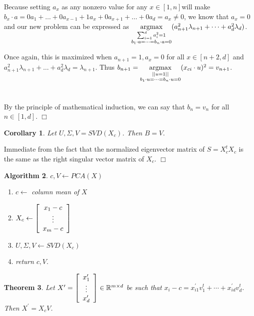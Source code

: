 \documentclass{article}%
\newtheorem{theorem}{Theorem}
\newtheorem{algorithm}[theorem]{Algorithm}
\newtheorem{corollary}[theorem]{Corollary}
\newenvironment{proof}{\noindent{\em Proof:}}{$\Box$~\\}
\begin{document}
\begin{proof}
Because setting $a_x$ as any nonzero value for any $x\in[1,n]$will make $b_x\cdot a =0a_1+\dots+0a_{x-1}+1a_x+0a_{x+1}+\dots+0a_d=a_x\neq 0$, we know that $a_x=0$ and our new problem can be expressed as $\underset{\substack{\sum_{i=1}^d a_i^2 =1\\b_1\cdot a=\dots=b_n \cdot a=0}}{\textnormal{argmax}}(a_{n+1}^2\lambda_{n+1}+\dots+a_d^2\lambda_d)$.

 Once again, this is maximized when $a_{n+1}=1,a_x=0$ for all $x\in[n+2,d]$ and $a_{n+1}^2\lambda_{n+1}+\dots+a_d^2\lambda_d=\lambda_{n+1}$. Thus $b_{n+1}=\underset{\substack{||u=1||\\b_1 \cdot u=\dots=b_n \cdot u=0}}{\textnormal{argmax}}(x_{ci}\cdot u)^2=v_{n+1}$.
\\~\\~\\
By the principle of mathematical induction, we can say that $b_n=v_n$ for all $n\in[1,d]$.
\end{proof}
\pagebreak
\begin{corollary}
Let $U,\Sigma,V=SVD\left(  X_{c}\right)  $. Then $B=V.$
\end{corollary}

\begin{proof}
Immediate from the fact that the normalized eigenvector matrix of
$S=X_{c}^{t}X_{c}$ is the same as the right singular vector matrix of $X_{c}$.
\end{proof}

\begin{algorithm}
$c,V\leftarrow PCA\left(  X\right)  $

\begin{enumerate}
\item $c\leftarrow$ column mean of $X$

\item $X_{c}\leftarrow\left[
\begin{array}
[c]{c}%
x_{1}-c\\
\vdots\\
x_{m}-c
\end{array}
\right]  $

\item $U,\Sigma,V\leftarrow SVD\left(  X_{c}\right)  $

\item return $c,V$.\ 
\end{enumerate}
\end{algorithm}

\begin{theorem}
Let $X^{\prime}=\left[
\begin{array}
[c]{c}%
x_{1}^{\prime}\\
\vdots\\
x_{d}^{\prime}%
\end{array}
\right]  \in\mathbb{R}^{m\times d}\ $be such that $x_{i}-c=x_{i1}^{\prime
}v_{1}^{t}+\cdots+x_{id}^{\prime}v_{d}^{t}$. Then $X^{\prime}=X_{c}V$.
\end{theorem}
\end{document}

